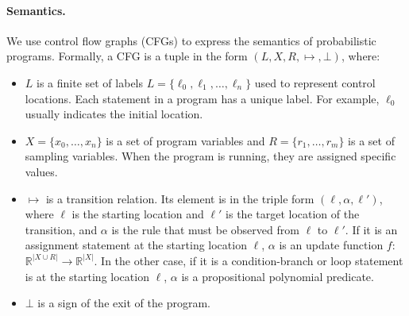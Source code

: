 \documentclass[runningheads]{llncs}
\begin{document}
\paragraph{Semantics.} We use control flow graphs (CFGs) to express the semantics of probabilistic programs. Formally, a CFG is a tuple in the form $(L,X,R,\mapsto,\bot)$, where:
\renewcommand{\labelitemi}{$\vcenter{\hbox{\tiny$\bullet$}}$}
\begin{itemize}
	\item $L$ is a finite set of labels $L=\{\ell_0,\ell_1,\dots,\ell_n\}$ used to represent control locations. Each statement in a program has a unique label. For example, $\ell_0$ usually indicates the initial location.
	
	\item $X=\{x_0,\dots,x_n\}$ is a set of program variables and $R=\{r_1,\dots,r_m\}$ is a set of sampling variables. When the program is running, they are assigned specific values.
	
	\item $\mapsto$ is a transition relation. Its element is in the triple form  $(\ell,\alpha,\ell')$, where $\ell$ is the starting location and $\ell'$ is the target location of the transition, and $\alpha$ is the rule that must be observed 
	from $\ell$ to $\ell'$. If it is an assignment statement at the starting location $\ell$, $\alpha$ is an update function $f$: $\mathbb{R}^{|X\cup R|}\to \mathbb{R}^{|X|}$. In the other case, if it is a condition-branch or loop statement is at the starting location $\ell$, $\alpha$ is a propositional polynomial predicate.
	
	\item $\bot$ is a sign of the exit of the program.
\end{itemize}
\end{document}
